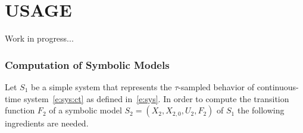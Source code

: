 \documentclass[a4paper]{amsart}
\begin{document}
\newpage


\part{USAGE}

{\color{red} Work in progress...}

\section{Computation of Symbolic Models}
\label{s:usage:abs}

Let $S_1$ be a simple system that represents the $\tau$-sampled
behavior of continuous-time system~\eqref{e:sys:ct} as defined in~\eqref{e:sys}.
In order to compute the transition function $F_2$ of a symbolic model
$S_2=(X_2,X_{2,0},U_2,F_2)$ of $S_1$ the following ingredients are needed.
\end{document}
